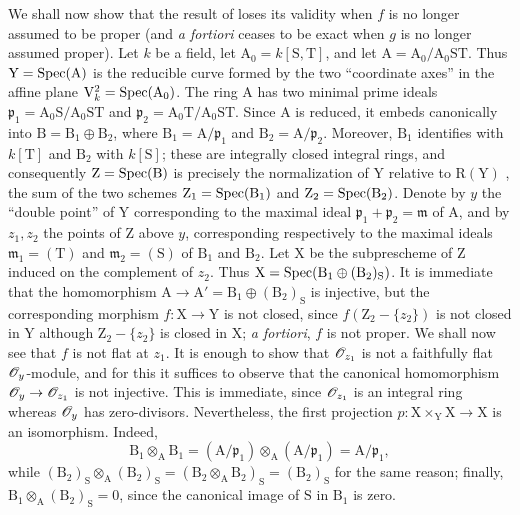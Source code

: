 \begin{env}[11.7.2]
\label{IV.11.7.2}
We shall now show that the result of  loses its validity when $f$ is no longer assumed to be proper (and \emph{a fortiori}  ceases to be exact when $g$ is no longer assumed proper).
Let $k$ be a field, let $\mathrm{A}_0=k[\mathrm{S},\mathrm{T}]$, and let $\mathrm{A}=\mathrm{A}_0/\mathrm{A}_0\mathrm{S}\mathrm{T}$. Thus $\mathrm{Y}=\operatorname{Spec}(\mathrm{A})$ is the reducible curve formed by the two ``coordinate axes'' in the affine plane $\mathrm{V}_k^2=\operatorname{Spec}(\mathrm{A}_0)$.
The ring $\mathrm{A}$ has two minimal prime ideals $\mathfrak{p}_1=\mathrm{A}_0\mathrm{S}/\mathrm{A}_0\mathrm{S}\mathrm{T}$ and $\mathfrak{p}_2=\mathrm{A}_0\mathrm{T}/\mathrm{A}_0\mathrm{S}\mathrm{T}$. Since $\mathrm{A}$ is reduced, it embeds canonically into $\mathrm{B}=\mathrm{B}_1\oplus\mathrm{B}_2$, where $\mathrm{B}_1=\mathrm{A}/\mathfrak{p}_1$ and $\mathrm{B}_2=\mathrm{A}/\mathfrak{p}_2$. Moreover, $\mathrm{B}_1$ identifies with $k[\mathrm{T}]$ and $\mathrm{B}_2$ with $k[\mathrm{S}]$; these are integrally closed integral rings, and consequently $\mathrm{Z}=\operatorname{Spec}(\mathrm{B})$ is precisely the normalization of $\mathrm{Y}$ relative to $\mathrm{R}(\mathrm{Y})$ , the sum of the two schemes $\mathrm{Z}_1=\operatorname{Spec}(\mathrm{B}_1)$ and $\mathrm{Z}_2=\operatorname{Spec}(\mathrm{B}_2)$.
Denote by $y$ the ``double point'' of $\mathrm{Y}$ corresponding to the maximal ideal $\mathfrak{p}_1+\mathfrak{p}_2=\mathfrak{m}$ of $\mathrm{A}$, and by $z_1,z_2$ the points of $\mathrm{Z}$ above $y$, corresponding respectively to the maximal ideals $\mathfrak{m}_1=(\mathrm{T})$ and $\mathfrak{m}_2=(\mathrm{S})$ of $\mathrm{B}_1$ and $\mathrm{B}_2$.
Let $\mathrm{X}$ be the subprescheme of $\mathrm{Z}$ induced on the complement of $z_2$. Thus $\mathrm{X}=\operatorname{Spec}(\mathrm{B}_1\oplus(\mathrm{B}_2)_\mathrm{S})$. It is immediate that the homomorphism $\mathrm{A}\to\mathrm{A}'=\mathrm{B}_1\oplus(\mathrm{B}_2)_\mathrm{S}$ is injective, but the corresponding morphism $f:\mathrm{X}\to\mathrm{Y}$ is not closed, since $f(\mathrm{Z}_2-\{z_2\})$ is not closed in $\mathrm{Y}$ although $\mathrm{Z}_2-\{z_2\}$ is closed in $\mathrm{X}$; \emph{a fortiori}, $f$ is not proper.
We shall now see that $f$ is not flat at $z_1$. It is enough to show  that $\mathscr{O}_{z_1}$ is not a faithfully flat $\mathscr{O}_y$-module, and for this it suffices to observe that the canonical homomorphism $\mathscr{O}_y\to\mathscr{O}_{z_1}$ is not injective. This is immediate, since $\mathscr{O}_{z_1}$ is an integral ring whereas $\mathscr{O}_y$ has zero-divisors.
Nevertheless, the first projection $p:\mathrm{X}\times_\mathrm{Y}\mathrm{X}\to\mathrm{X}$ is an isomorphism. Indeed,
\[
\mathrm{B}_1\otimes_\mathrm{A}\mathrm{B}_1
=(\mathrm{A}/\mathfrak{p}_1)\otimes_\mathrm{A}(\mathrm{A}/\mathfrak{p}_1)
=\mathrm{A}/\mathfrak{p}_1,
\]
while $(\mathrm{B}_2)_\mathrm{S}\otimes_\mathrm{A}(\mathrm{B}_2)_\mathrm{S}=(\mathrm{B}_2\otimes_\mathrm{A}\mathrm{B}_2)_\mathrm{S}=(\mathrm{B}_2)_\mathrm{S}$ for the same reason; finally, $\mathrm{B}_1\otimes_\mathrm{A}(\mathrm{B}_2)_\mathrm{S}=0$, since the canonical image of $\mathrm{S}$ in $\mathrm{B}_1$ is zero.
\end{env}

